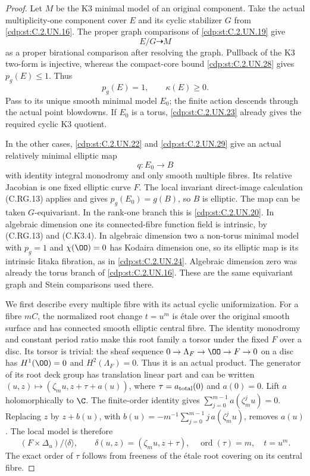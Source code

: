 \begin{proof}
Let $M$ be the K3 minimal model of an original
component. Take the actual multiplicity-one
component cover $E$ and its cyclic stabilizer
$G$ from \ref{cdp:st:C.2.UN.16}. The proper graph comparisons
of \ref{cdp:st:C.2.UN.19} give
\[
                         E/G\dashrightarrow M
                                                               \tag{C.KX.1}\label{cdp:eq:C.KX.1}
\]
as a proper birational comparison after
resolving the graph. Pullback of the K3
two-form is injective, whereas the
compact-core bound \ref{cdp:st:C.2.UN.28} gives $p_g(E)\le1$.
Thus
\[
                       p_g(E)=1,\qquad\kappa(E)\ge0.
                                                               \tag{C.KX.2}\label{cdp:eq:C.KX.2}
\]
Pass to its unique smooth minimal model
$E_0$; the finite action descends through
the actual point blowdowns.
If $E_0$ is a torus, \ref{cdp:st:C.2.UN.23} already gives
the required cyclic K3 quotient.

In the other cases, \ref{cdp:st:C.2.UN.22} and \ref{cdp:st:C.2.UN.29} give
an actual relatively minimal elliptic map
\[
                   q:E_0\longrightarrow B
                                                               \tag{C.KX.3}\label{cdp:eq:C.KX.3}
\]
with identity integral monodromy and
only smooth multiple fibres. Its
relative Jacobian is one fixed elliptic
curve $F$. The local invariant
direct-image calculation (C.RG.13)
applies and gives
$p_g(E_0)=g(B)$, so $B$ is elliptic.
The map can be taken $G$-equivariant.
In the rank-one branch this is \ref{cdp:st:C.2.UN.20}.
In algebraic dimension one its
connected-fibre function field is
intrinsic, by (C.RG.13) and
(C.K3.4). In algebraic dimension
two a non-torus minimal model
with $p_g=1$ and $\chi(\OO)=0$
has Kodaira dimension one, so
its elliptic map is its intrinsic
Iitaka fibration, as in \ref{cdp:st:C.2.UN.24}.
Algebraic dimension zero was
already the torus branch of \ref{cdp:st:C.2.UN.16}.
These are the same equivariant
graph and Stein comparisons
used there.

We first describe every multiple
fibre with its actual cyclic
uniformization. For a fibre $mC$,
the normalized root change
$t=u^m$ is \'etale over the
original smooth surface and
has connected smooth elliptic
central fibre. The identity
monodromy and constant period
ratio make this root family
a torsor under the fixed $F$
over a disc. Its torsor is
trivial: the sheaf sequence
$0\to\Lambda_F\to\OO\to F\to0$
on a disc has $H^1(\OO)=0$
and $H^2(\Lambda_F)=0$.
Thus it is an actual product.
The generator of its root
deck group has translation
linear part and can be
written
$(u,z)\mapsto(\zeta_m u,z+\tau+a(u))$,
where $\tau=a_{\rm total}(0)$
and $a(0)=0$.
Lift $a$ holomorphically to
$\C$. The finite-order
identity gives
$\sum_{j=0}^{m-1}a(\zeta_m^ju)=0$.
Replacing $z$ by $z+b(u)$,
with
$b(u)=-m^{-1}\sum_{j=0}^{m-1}j\,a(\zeta_m^ju)$,
removes $a(u)$.
The local model is therefore
\[
 (F\times\Delta_u)/\langle\delta\rangle,
 \qquad
 \delta(u,z)=(\zeta_m u,z+\tau),\quad
 \operatorname{ord}(\tau)=m,\quad t=u^m .
                                                               \tag{C.KX.4}\label{cdp:eq:C.KX.4}
\]
The exact order of $\tau$
follows from freeness of
the \'etale root covering
on its central fibre.


\end{proof}
